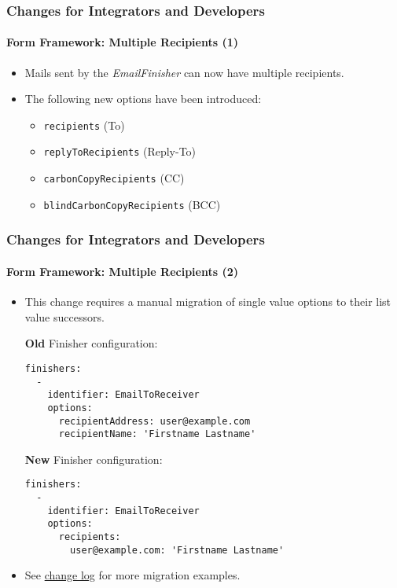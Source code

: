 \begin{frame}[fragile]
	\frametitle{Changes for Integrators and Developers}
	\framesubtitle{Form Framework: Multiple Recipients (1)}

	\begin{itemize}
		\item Mails sent by the \textit{EmailFinisher} can now have multiple recipients.

		\item The following new options have been introduced:

			\begin{itemize}
				\item \texttt{recipients} (To)
				\item \texttt{replyToRecipients} (Reply-To)
				\item \texttt{carbonCopyRecipients} (CC)
				\item \texttt{blindCarbonCopyRecipients} (BCC)
			\end{itemize}

	\end{itemize}

\end{frame}


\begin{frame}[fragile]
	\frametitle{Changes for Integrators and Developers}
	\framesubtitle{Form Framework: Multiple Recipients (2)}

	\lstset{basicstyle=\tiny\ttfamily}

	\begin{itemize}
		\item This change requires a manual migration of single value options to their list value successors.

		\smaller\textbf{Old} Finisher configuration:\normalsize

\begin{lstlisting}
finishers:
  -
    identifier: EmailToReceiver
    options:
      recipientAddress: user@example.com
      recipientName: 'Firstname Lastname'
\end{lstlisting}

		\smaller\textbf{New} Finisher configuration:\normalsize

\begin{lstlisting}
finishers:
  -
    identifier: EmailToReceiver
    options:
      recipients:
        user@example.com: 'Firstname Lastname'
\end{lstlisting}

		\item See \href{https://docs.typo3.org/c/typo3/cms-core/10.0/en-us/Changelog/master/Deprecation-80420-EmailFinisherSingleAddressOptions.html}{change log}
			for more migration examples.

	\end{itemize}

\end{frame}

